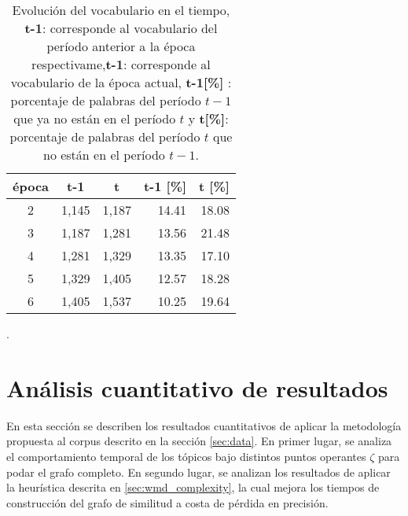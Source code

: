 \begin{table}[H]
    \begin{tabular}{|c|r|r|r|r|}
    \hline
    \textbf{época} & \multicolumn{1}{c|}{\textbf{t-1}} & \multicolumn{1}{c|}{\textbf{t}} & \multicolumn{1}{c|}{\textbf{t-1 {[}\%{]}}} & \multicolumn{1}{l|}{\textbf{t {[}\%{]}}} \\ \hline
    2              & 1,145                              & 1,187                            & 14.41                                      & 18.08                                    \\ \hline
    3              & 1,187                              & 1,281                            & 13.56                                      & 21.48                                    \\ \hline
    4              & 1,281                              & 1,329                            & 13.35                                      & 17.10                                    \\ \hline
    5              & 1,329                              & 1,405                            & 12.57                                      & 18.28                                    \\ \hline
    6              & 1,405                              & 1,537                            & 10.25                                      & 19.64                                    \\ \hline
    \end{tabular}
    \caption{Evolución del vocabulario en el tiempo, \textbf{t-1}: corresponde al vocabulario del período anterior a la época respectivame,\textbf{t-1}: corresponde al vocabulario de la época actual, \textbf{t-1[\%]}
    : porcentaje de palabras del período $t-1$ que ya no están en el período $t$ y \textbf{t[\%]}: porcentaje de palabras del período $t$ que no están en el período $t-1$.}
    \label{table:innovation_rate}.
\end{table}


\section{Análisis cuantitativo de resultados}
\label{sec:quantative}

En esta sección se describen los resultados cuantitativos de aplicar la metodología propuesta al corpus descrito en la sección \ref{sec:data}. En primer lugar, se analiza el comportamiento temporal de los tópicos bajo distintos puntos operantes $\zeta$ para podar el grafo completo. En segundo lugar, se analizan los resultados de aplicar la heurística descrita en \ref{sec:wmd_complexity}, la cual mejora los tiempos de construcción del grafo de similitud a costa de pérdida en precisión.

